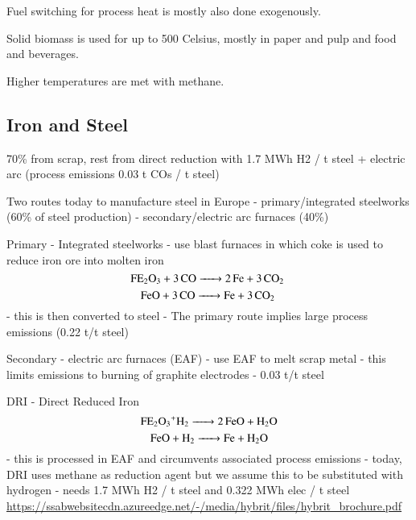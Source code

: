 Fuel switching for process heat is mostly also done exogenously.

Solid biomass is used for up to 500 Celsius, mostly in paper and pulp and food
and beverages.

Higher temperatures are met with methane.


\subsection{Iron and Steel}


70\% from scrap, rest from direct reduction with 1.7 MWh H2 / t steel + electric arc (process emissions 0.03 t COs / t steel)

Two routes today to manufacture steel in Europe
- primary/integrated steelworks (60\% of steel production)
- secondary/electric arc furnaces (40\%) 

Primary - Integrated steelworks
- use blast furnaces in which coke is used to reduce iron ore into molten iron
\begin{equation}
    \ce{FE2O3 + 3CO -> 2Fe + 3\co}
\end{equation}
\begin{equation}
    \ce{FeO + 3CO -> Fe + 3\co}
\end{equation}
- this is then converted to steel
- The primary route implies large process emissions (0.22 t\co/t steel)

Secondary - electric arc furnaces (EAF)
- use EAF to melt scrap metal
- this limits \co emissions to burning of graphite electrodes 
- 0.03 t\co/t steel

DRI - Direct Reduced Iron
\begin{equation}
    \ce{FE2O3+H2 -> 2FeO + H2O}
\end{equation}
\begin{equation}
    \ce{FeO + H2 -> Fe + H2O}
\end{equation}
- this is processed in EAF and circumvents associated process emissions
- today, DRI uses methane as reduction agent but we assume this to be substituted with hydrogen
- needs 1.7 MWh H2 / t steel  and 0.322 MWh elec / t steel \url{https://ssabwebsitecdn.azureedge.net/-/media/hybrit/files/hybrit_brochure.pdf}

